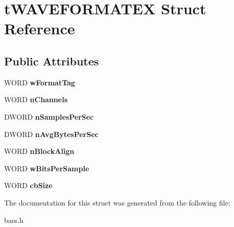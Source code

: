 \hypertarget{structtWAVEFORMATEX}{}\section{t\+W\+A\+V\+E\+F\+O\+R\+M\+A\+T\+E\+X Struct Reference}
\label{structtWAVEFORMATEX}
\subsection*{Public Attributes}
\begin{DoxyCompactItemize}
\item 
\hypertarget{structtWAVEFORMATEX_aec624a88d0d94d7789c60dcc1418d6fc}{}W\+O\+R\+D {\bfseries w\+Format\+Tag}\label{structtWAVEFORMATEX_aec624a88d0d94d7789c60dcc1418d6fc}

\item 
\hypertarget{structtWAVEFORMATEX_ae71090e815279542a4f2ffea72ff1a07}{}W\+O\+R\+D {\bfseries n\+Channels}\label{structtWAVEFORMATEX_ae71090e815279542a4f2ffea72ff1a07}

\item 
\hypertarget{structtWAVEFORMATEX_ad3a2f0a0aed0d8b3a5f6afad5f8b6acc}{}D\+W\+O\+R\+D {\bfseries n\+Samples\+Per\+Sec}\label{structtWAVEFORMATEX_ad3a2f0a0aed0d8b3a5f6afad5f8b6acc}

\item 
\hypertarget{structtWAVEFORMATEX_a933a772d450a8a8939fc96d1eb15c672}{}D\+W\+O\+R\+D {\bfseries n\+Avg\+Bytes\+Per\+Sec}\label{structtWAVEFORMATEX_a933a772d450a8a8939fc96d1eb15c672}

\item 
\hypertarget{structtWAVEFORMATEX_abb977590324e3d1b5a14f94b806b8ec1}{}W\+O\+R\+D {\bfseries n\+Block\+Align}\label{structtWAVEFORMATEX_abb977590324e3d1b5a14f94b806b8ec1}

\item 
\hypertarget{structtWAVEFORMATEX_a888d33f1b1415c903bfa95ebedc78516}{}W\+O\+R\+D {\bfseries w\+Bits\+Per\+Sample}\label{structtWAVEFORMATEX_a888d33f1b1415c903bfa95ebedc78516}

\item 
\hypertarget{structtWAVEFORMATEX_a179487978b7d541067d6200524ceff2c}{}W\+O\+R\+D {\bfseries cb\+Size}\label{structtWAVEFORMATEX_a179487978b7d541067d6200524ceff2c}

\end{DoxyCompactItemize}


The documentation for this struct was generated from the following file\+:\begin{DoxyCompactItemize}
\item 
bass.\+h\end{DoxyCompactItemize}
